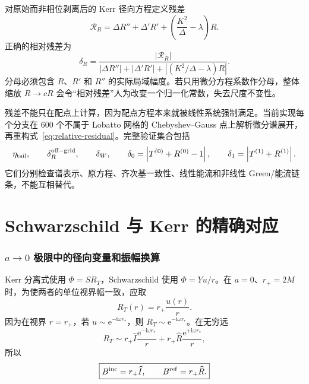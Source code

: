 \documentclass[UTF8,fontset=fandol,11pt,a4paper]{ctexart}
\newcommand{\ii}{\mathrm i}
\newcommand{\ee}{\mathrm e}
\newcommand{\Bin}{B^{\rm inc}}
\newcommand{\Bref}{B^{\rm ref}}
\newcommand{\Deltak}{\Delta}
\newcommand{\abs}[1]{\left|#1\right|}
\begin{document}
对原始而非相位剥离后的 Kerr 径向方程定义残差
\begin{equation}
\mathcal R_R=\Deltak R''+\Deltak'R'
+\left(\frac{K^2}{\Deltak}-\lambda\right)R.
\end{equation}
正确的相对残差为
\begin{equation}
\boxed{
\delta_R=
\frac{\abs{\mathcal R_R}}
{\abs{\Deltak R''}+\abs{\Deltak'R'}
+\abs{(K^2/\Deltak-\lambda)R}}.}
\label{eq:relative-residual}
\end{equation}
分母必须包含 $R$、$R'$ 和 $R''$ 的实际局域幅度。若只用微分方程系数作分母，整体缩放 $R\to cR$ 会令“相对残差”人为改变一个归一化常数，失去尺度不变性。

残差不能只在配点上计算，因为配点方程本来就被线性系统强制满足。当前实现每个分支在 600 个不属于 Lobatto 网格的 Chebyshev--Gauss 点上解析微分谱展开，再重构式~\eqref{eq:relative-residual}。完整验证集合包括
\begin{equation}
\eta_{\rm tail},\qquad
\delta_R^{\rm off-grid},\qquad
\delta_W,\qquad
\delta_0=\abs{T^{(0)}+R^{(0)}-1},\qquad
\delta_1=\abs{T^{(1)}+R^{(1)}}.
\label{eq:all-diagnostics}
\end{equation}
它们分别检查谱表示、原方程、齐次基一致性、线性能流和非线性 Green/能流链条，不能互相替代。

\part{Schwarzschild 与 Kerr 的精确对应}

\section{\texorpdfstring{$a\to0$}{a to 0} 极限中的径向变量和振幅换算}
\label{sec:a0}

Kerr 分离式使用 $\Phi=SR_T$，Schwarzschild 使用 $\Phi=Yu/r$。在 $a=0$、$r_+=2M$ 时，为使两者的单位视界幅一致，应取
\begin{equation}
\boxed{R_T(r)=r_+\frac{u(r)}{r}.}
\label{eq:RT-u}
\end{equation}
因为在视界 $r=r_+$，若 $u\sim\ee^{-\ii\omega r_*}$，则 $R_T\sim\ee^{-\ii\omega r_*}$。在无穷远
\begin{equation}
R_T\sim r_+\widehat I\frac{\ee^{-\ii\omega r_*}}{r}
+r_+\widehat R\frac{\ee^{+\ii\omega r_*}}{r},
\end{equation}
所以
\begin{equation}
\boxed{\Bin=r_+\widehat I,\qquad \Bref=r_+\widehat R.}
\label{eq:B-I}
\end{equation}
\end{document}
